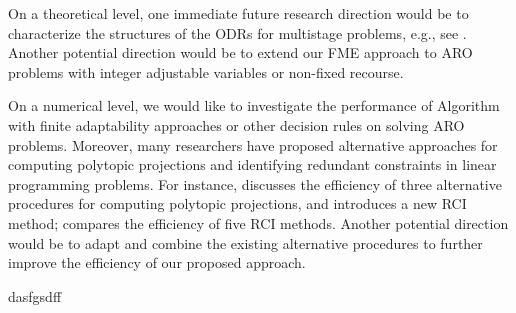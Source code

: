\documentclass[mnsc,dblanonrev]{informs3test}
\begin{document}
	     On a theoretical level, one immediate future research direction would be to characterize the structures of the ODRs for multistage problems, e.g., see \cite{bip10,iss13}.  {Another potential direction would be to extend our FME approach to ARO problems with integer adjustable variables or non-fixed recourse.}
		
		On a numerical level, we would like to investigate the performance of Algorithm with finite adaptability approaches or other decision rules on solving ARO problems.  Moreover, many researchers have proposed alternative approaches for computing polytopic projections and identifying redundant constraints in linear programming problems. For instance, \cite{hll92} discusses the efficiency of three alternative procedures for computing polytopic projections, and introduces a new RCI method; \cite{ps10} compares the efficiency of five RCI methods. Another potential direction would be to adapt and combine the existing alternative procedures to further improve the efficiency of our proposed approach.
		
		
		
\begin{appendices}

	dasfgsdff

\end{appendices}	


		
		
\end{document}
